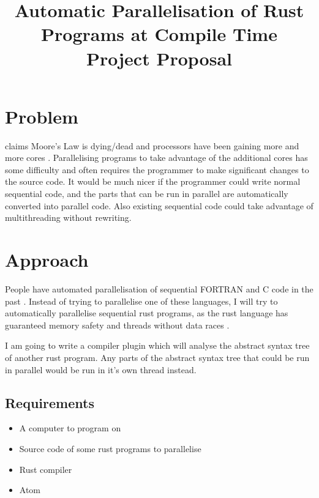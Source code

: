 \documentclass[12pt, a4paper]{article}
\title{
	\vspace{-4ex}
	\LARGE\textbf{Automatic Parallelisation of Rust Programs at Compile Time} \\
	\vspace{1ex}
	\large\textbf{Project Proposal}
	\vspace{-9ex}
}
\date{}
\begin{document}
\maketitle
{}

\section{Problem}
\textcite{kish2002end} claims Moore's Law is dying/dead and processors have been gaining more and more cores \parencite{geer2005chip}. Parallelising programs to take advantage of the additional cores has some difficulty and often requires the programmer to make significant changes to the source code. It would be much nicer if the programmer could write normal sequential code, and the parts that can be run in parallel are automatically converted into parallel code. Also existing sequential code could take advantage of multithreading without rewriting.

\section{Approach}
People have automated parallelisation of sequential FORTRAN and C code in the past \parencite{d1998fortran,baskaran2010automatic}. Instead of trying to parallelise one of these languages, I will try to automatically parallelise sequential rust programs, as the rust language has guaranteed memory safety and threads without data races \parencite{rustlang}.

I am going to write a compiler plugin which will analyse the abstract syntax tree of another rust program. Any parts of the abstract syntax tree that could be run in parallel would be run in it's own thread instead.

\subsection{Requirements}
\begin{itemize}
	\item A computer to program on
	\item Source code of some rust programs to parallelise
	\item Rust compiler
	\item Atom
\end{itemize}
\end{document}
